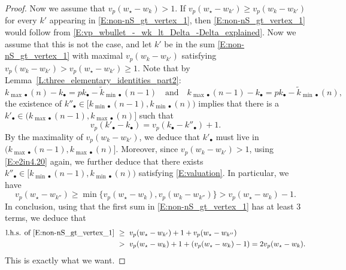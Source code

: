 \begin{proof}
    Now we assume that $v_p(w_\star - w_k) >1$.
    If $v_p(w_\star - w_{k'}) \geq  v_p(w_k-w_{k'})$ for every $k'$ appearing in \eqref{E:non-nS_gt_vertex_1}, then \eqref{E:non-nS_gt_vertex_1} would follow from \eqref{E:vp_wbullet_-_wk_lt_Delta_-Delta_explained}. Now we assume that this is not the case, and let $k'$ be in the sum \eqref{E:non-nS_gt_vertex_1} with maximal $v_p(w_k-w_{k'})$ satisfying $v_p(w_k-w_{k'})>v_p(w_\star - w_{k'}) \geq  1$. Note that by Lemma~\ref{L:three_elementary_identities_part2}:
    \begin{equation}
    \label{E:e2in4.20}
    k_{{\max}\bullet}(n) - k_\bullet = pk_\bullet - \tilde k_{{\min}\bullet}(n -1)  \quad \textrm{and} \quad k_{{\max}\bullet}(n-1) - k_\bullet = pk_\bullet - \tilde k_{{\min}\bullet}(n),
    \end{equation}
    the existence of $k''_\bullet \in [k_{{\min}\bullet}(n-1) , k_{{\min}\bullet}(n))$ implies that there is a $k'_\bullet\in (k_{{\max}\bullet}(n-1), k_{{\max}\bullet}(n)]$ such that
    \begin{equation}
    \label{E:valuation}
    v_p(k'_\bullet - k_\bullet) = v_p(k_\bullet - k''_\bullet) +1.
    \end{equation}
    By the maximality of $v_p(w_k-w_{k'})$, we deduce that $k'_\bullet$ must live in $(k_{{\max}\bullet}(n-1), k_{{\max}\bullet}(n)]$. Moreover, since $v_p(w_k-w_{k'})>1$, using \eqref{E:e2in4.20} again, we further deduce that there exists $k''_\bullet \in [k_{{\min}\bullet}(n-1) , k_{{\min}\bullet}(n))$ satisfying \eqref{E:valuation}. In particular, we have
    $$
    v_p(w_\star - w_{k''}) \geq \min\{v_p(w_\star - w_{k}), v_p(w_k - w_{k''}) \} > v_p(w_\star - w_k)-1.
    $$
    In conclusion, using that the first sum in \eqref{E:non-nS_gt_vertex_1} has at least $3$ terms, we deduce that
    \begin{align*}
    \textrm{l.h.s. of \eqref{E:non-nS_gt_vertex_1}}\ &\geq \ v_p(w_\star - w_{k'}) + 1 + v_p(w_\star - w_{k''}) \\
     &> \
    v_p(w_\star - w_{k})+1 + (v_p(w_\star - w_k)-1) = 2v_p(w_\star - w_{k}).
    \end{align*}
    This is exactly what we want.
\end{proof}

